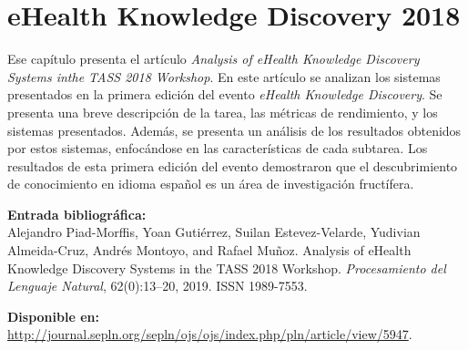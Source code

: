 
\chapter[eHealth Knowledge Discovery 2018: \textit{Analysis of eHealth Knowledge Discovery Systems inthe TASS 2018 Workshop}]{eHealth Knowledge Discovery 2018}
\label{Chap:eHealthKD18}

Ese capítulo presenta el artículo \textit{Analysis of eHealth Knowledge Discovery Systems inthe TASS 2018 Workshop}.
En este artículo se analizan los sistemas presentados en la primera edición del evento \textit{eHealth Knowledge Discovery}.
Se presenta una breve descripción de la tarea, las métricas de rendimiento, y los sistemas presentados.
Además, se presenta un análisis de los resultados obtenidos por estos sistemas, enfocándose en las características de cada subtarea.
Los resultados de esta primera edición del evento demostraron que el descubrimiento de conocimiento en idioma español es un área de investigación fructífera.

\BlankLine
\noindent \textbf{Entrada bibliográfica:}\\
Alejandro Piad-Morffis, Yoan Gutiérrez, Suilan Estevez-Velarde, Yudivian Almeida-Cruz, Andrés Montoyo, and Rafael Muñoz. Analysis of eHealth Knowledge Discovery Systems in the TASS 2018 Workshop. \textit{Procesamiento del Lenguaje Natural}, 62(0):13--20, 2019. ISSN 1989-7553.

\BlankLine
\noindent \textbf{Disponible en:} \url{http://journal.sepln.org/sepln/ojs/ojs/index.php/pln/article/view/5947}.
